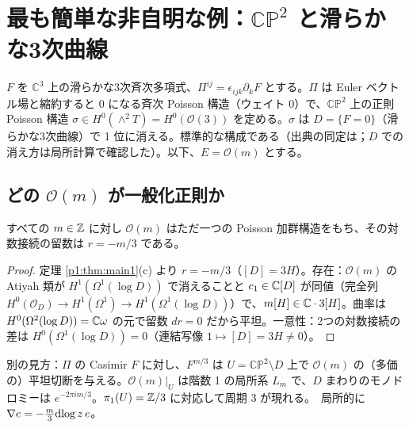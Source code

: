 \section{最も簡単な非自明な例：$\mathbb{CP}^2$ と滑らかな3次曲線}\label{p1:sec:cp2}
$F$ を $\mathbb C^3$ 上の滑らかな3次斉次多項式、$\Pi^{ij}=\epsilon_{ijk}\partial_kF$ とする。$\Pi$ は Euler ベクトル場と縮約すると 0 になる斉次 Poisson 構造（ウェイト 0）で、$\mathbb{CP}^2$ 上の正則 Poisson 構造 $\sigma\in H^0(\wedge^2T)=H^0(\mathcal O(3))$ を定める。$\sigma$ は $D=\{F=0\}$（滑らかな3次曲線）で 1 位に消える。標準的な構成である（出典の同定は\tQ；$D$ での消え方は局所計算で確認した）。以下、$E=\mathcal O(m)$ とする。

\subsection{どの $\mathcal O(m)$ が一般化正則か}
\begin{prop}\tP\label{p1:prop:cp2mod}
すべての $m\in\mathbb Z$ に対し $\mathcal O(m)$ はただ一つの Poisson 加群構造をもち、その対数接続の留数は $r=-m/3$ である。
\end{prop}
\begin{proof}
定理 \ref{p1:thm:main1}(c) より $r=-m/3$（$[D]=3H$）。存在：$\mathcal O(m)$ の Atiyah 類が $H^1(\Omega^1(\log D))$ で消えることと $c_1\in\mathbb C[D]$ が同値（完全列 $H^0(\mathcal O_D)\to H^1(\Omega^1)\to H^1(\Omega^1(\log D))$）で、$m[H]\in\mathbb C\cdot3[H]$。曲率は $H^0(\Omega^2(\log D))=\mathbb C\omega$ の元で留数 $dr=0$ だから平坦。一意性：2つの対数接続の差は $H^0(\Omega^1(\log D))=0$（連結写像 $1\mapsto[D]=3H\ne0$）。\qedhere
\end{proof}
別の見方：$\Pi$ の Casimir $F$ に対し、$F^{m/3}$ は $U=\mathbb{CP}^2\setminus D$ 上で $\mathcal O(m)$ の（多価の）平坦切断を与える。$\mathcal O(m)|_U$ は階数 1 の局所系 $L_m$ で、$D$ まわりのモノドロミーは $e^{-2\pi im/3}$。$\pi_1(U)=\mathbb Z/3$ に対応して周期 3 が現れる。\tP\ 局所的に $\nabla e=-\tfrac m3\mathrm{dlog}\, z\,e$。

